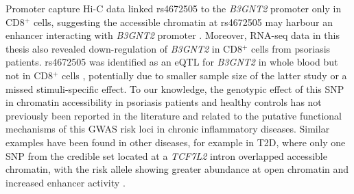 Promoter capture Hi-C data linked rs4672505 to the \textit{B3GNT2} promoter only in CD8$^+$ cells, suggesting the accessible chromatin at rs4672505 may harbour an enhancer interacting with \textit{B3GNT2} promoter \parencite{Javierre2016}. Moreover, RNA-seq data in this thesis also revealed down-regulation of \textit{B3GNT2} in CD8$^+$ cells from psoriasis patients. rs4672505 was identified as an eQTL for \textit{B3GNT2} in whole blood \parencite{Jansen2017} but not in CD8$^+$ cells \parencite{Kasela2017}, potentially due to smaller sample size of the latter study or a missed stimuli-specific effect. To our knowledge, the genotypic effect of this SNP in chromatin accessibility in psoriasis patients and healthy controls has not previously been reported in the literature and related to the putative functional mechanisms of this GWAS risk loci in chronic inflammatory diseases.%
Similar examples have been found in other diseases, for example in T2D, where only one SNP from the credible set located at a \textit{TCF7L2} intron overlapped accessible chromatin, with the risk allele showing greater abundance at open chromatin and increased enhancer activity \parencite{Gaulton2010, Stefan2014}.

